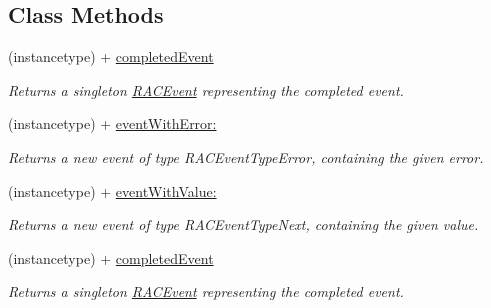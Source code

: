 \subsection*{Class Methods}
\begin{DoxyCompactItemize}
\item 
\mbox{\label{interface_r_a_c_event_a583e76d3b522a3657dfe9de8f53cacd0}} 
(instancetype) + \mbox{\hyperlink{interface_r_a_c_event_a583e76d3b522a3657dfe9de8f53cacd0}{completed\+Event}}
\begin{DoxyCompactList}\small\item\em Returns a singleton \mbox{\hyperlink{interface_r_a_c_event}{R\+A\+C\+Event}} representing the {\ttfamily completed} event. \end{DoxyCompactList}\item 
\mbox{\label{interface_r_a_c_event_aaebc908a1477a8d79d85a81101beaee7}} 
(instancetype) + \mbox{\hyperlink{interface_r_a_c_event_aaebc908a1477a8d79d85a81101beaee7}{event\+With\+Error\+:}}
\begin{DoxyCompactList}\small\item\em Returns a new event of type R\+A\+C\+Event\+Type\+Error, containing the given error. \end{DoxyCompactList}\item 
\mbox{\label{interface_r_a_c_event_aac79397e437b0a76901d41d38cc46791}} 
(instancetype) + \mbox{\hyperlink{interface_r_a_c_event_aac79397e437b0a76901d41d38cc46791}{event\+With\+Value\+:}}
\begin{DoxyCompactList}\small\item\em Returns a new event of type R\+A\+C\+Event\+Type\+Next, containing the given value. \end{DoxyCompactList}\item 
\mbox{\label{interface_r_a_c_event_a583e76d3b522a3657dfe9de8f53cacd0}} 
(instancetype) + \mbox{\hyperlink{interface_r_a_c_event_a583e76d3b522a3657dfe9de8f53cacd0}{completed\+Event}}
\begin{DoxyCompactList}\small\item\em Returns a singleton \mbox{\hyperlink{interface_r_a_c_event}{R\+A\+C\+Event}} representing the {\ttfamily completed} event. \end{DoxyCompactList}\item 

\end{DoxyCompactItemize}

